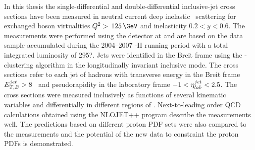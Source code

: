 In this thesis the single-differential and double-differential inclusive-jet cross sections have been measured in neutral current deep inelastic \ep\, scattering for exchanged boson virtualities $\qsq>\,125\,\GeV$ and inelasticity $0.2<y<0.6$. The measurements were performed using the \zeus detector at \hera and are based on the data sample accumulated during the 2004--2007 \hera-II running period with a total integrated luminosity of 295?\invpb. Jets were identified in the Breit frame using the \kt-clustering algorithm in the longitudinally invariant inclusive mode. The cross sections refer to each jet of hadrons with transverse energy in the Breit frame $\mbox{$E_{T,B}^{jet}$} > 8$ \GeV\, and pseudorapidity in the laboratory frame $-1<\mbox{$\eta^{jet}_{lab}$}<2.5$. The cross sections were measured inclusively as functions of several kinematic variables and differentially in different regions of \qsq. Next-to-leading order QCD calculations obtained using the NLOJET++ program describe the measurements well. The predictions based on different proton PDF sets were also compared to the measurements and the potential of the new data to constraint the proton PDFs is demonstrated.